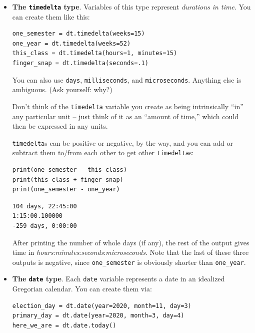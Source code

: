 \begin{itemize}
\itemsep1em


\item \textbf{The \texttt{timedelta} type}. Variables of this type represent
\textit{durations in time}. You can create them like this:

\begin{Verbatim}[fontsize=\small,samepage=true,frame=single,framesep=3mm]
one_semester = dt.timedelta(weeks=15)
one_year = dt.timedelta(weeks=52)
this_class = dt.timedelta(hours=1, minutes=15)
finger_snap = dt.timedelta(seconds=.1)
\end{Verbatim}

\vspace{-.15in}

You can also use \texttt{days}, \texttt{milliseconds}, and
\texttt{microseconds}. Anything else is ambiguous. (Ask yourself: why?)

\medskip

Don't think of the \texttt{timedelta} variable you create as being
intrinsically ``in'' any particular unit -- just think of it as an ``amount of
time,'' which could then be expressed in any units.

\texttt{timedelta}s can be positive or negative, by the way, and you can add or
subtract them to/from each other to get other \texttt{timedelta}s:

\begin{Verbatim}[fontsize=\small,samepage=true,frame=single,framesep=3mm]
print(one_semester - this_class)
print(this_class + finger_snap)
print(one_semester - one_year)
\end{Verbatim}
\vspace{-.2in}

\begin{Verbatim}[fontsize=\small,samepage=true,frame=leftline,framesep=5mm,framerule=1mm]
104 days, 22:45:00
1:15:00.100000
-259 days, 0:00:00
\end{Verbatim}

After printing the number of whole days (if any), the rest of the output gives
time in \textsl{hours}:\textsl{minutes}:\textsl{seconds}:\textsl{microseconds}. Note that the last of these three
outputs is negative, since \texttt{one\_semester} is obviously shorter than
\texttt{one\_year}.


\item \textbf{The \texttt{date} type}. Each \texttt{date} variable represents a
date in an idealized Gregorian calendar. You can create them via:
\begin{Verbatim}[fontsize=\small,samepage=true,frame=single,framesep=3mm]
election_day = dt.date(year=2020, month=11, day=3)
primary_day = dt.date(year=2020, month=3, day=4)
here_we_are = dt.date.today()
\end{Verbatim}


\end{itemize}
